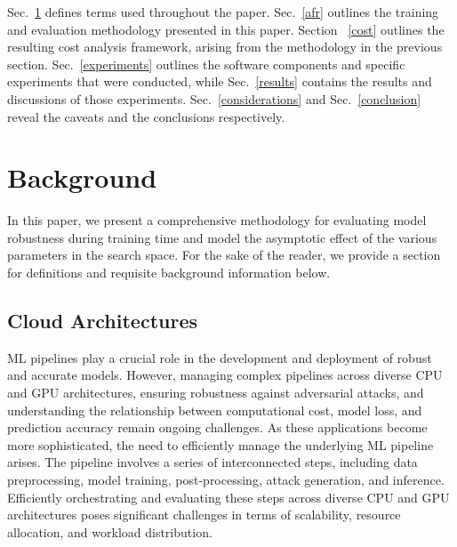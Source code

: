 \documentclass[journal]{IEEEtran}
\begin{document}
Sec.~\ref{background} defines terms used throughout the paper. Sec.~\ref{afr} outlines the training and evaluation methodology presented in this paper.  Section ~\ref{cost} outlines the resulting cost analysis framework, arising from the methodology in the previous section. Sec.~\ref{experiments} outlines the software components and specific experiments that were conducted, while Sec.~\ref{results} contains the results and discussions of those experiments. Sec.~\ref{considerations} and Sec.~\ref{conclusion} reveal the caveats and the conclusions respectively.


\section{Background}
\label{background}



In this paper, we present a comprehensive methodology for evaluating model robustness during training time and model the asymptotic effect of the various parameters in the search space. For the sake of the reader, we provide a section for definitions and requisite background information below.


\subsection{Cloud Architectures}


ML pipelines play a crucial role in the development and deployment of robust and accurate models. However, managing complex pipelines across diverse CPU and GPU architectures, ensuring robustness against adversarial attacks, and understanding the relationship between computational cost, model loss, and prediction accuracy remain ongoing challenges.
As these applications become more sophisticated, the need to efficiently manage the underlying ML pipeline arises. The pipeline involves a series of interconnected steps, including data preprocessing, model training, post-processing, attack generation, and inference. Efficiently orchestrating  and evaluating these steps across diverse CPU and GPU architectures poses significant challenges in terms of scalability, resource allocation, and workload distribution. 
\end{document}
